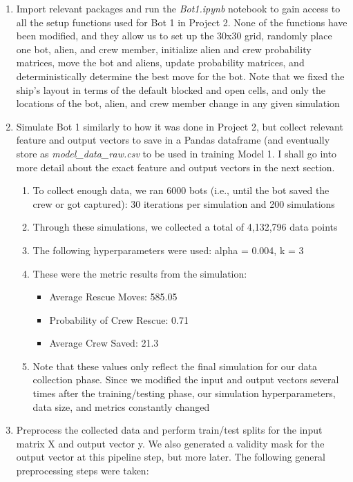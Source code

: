 \documentclass[11pt]{article}
\begin{document}
\begin{enumerate}
    \item Import relevant packages and run the \emph{Bot1.ipynb} notebook to gain access to all the setup functions used for Bot 1 in Project 2. None of the functions have been modified, and they allow us to set up the 30x30 grid, randomly place one bot, alien, and crew member, initialize alien and crew probability matrices, move the bot and aliens, update probability matrices, and deterministically determine the best move for the bot. Note that we fixed the ship's layout in terms of the default blocked and open cells, and only the locations of the bot, alien, and crew member change in any given simulation
    \item Simulate Bot 1 similarly to how it was done in Project 2, but collect relevant feature and output vectors to save in a Pandas dataframe (and eventually store as \emph{model\_data\_raw.csv} to be used in training Model 1. I shall go into more detail about the exact feature and output vectors in the next section.
    \begin{enumerate}
        \item To collect enough data, we ran 6000 bots (i.e., until the bot saved the crew or got captured): 30 iterations per simulation and 200 simulations
        \item Through these simulations, we collected a total of 4,132,796 data points
        \item The following hyperparameters were used: alpha = 0.004, k = 3
        \item These were the metric results from the simulation:
        \begin{itemize}
            \item Average Rescue Moves: 585.05
            \item Probability of Crew Rescue: 0.71
            \item Average Crew Saved: 21.3
        \end{itemize}
        \item Note that these values only reflect the final simulation for our data collection phase. Since we modified the input and output vectors several times after the training/testing phase, our simulation hyperparameters, data size, and metrics constantly changed
    \end{enumerate}
    \item Preprocess the collected data and perform train/test splits for the input matrix X and output vector y. We also generated a validity mask for the output vector at this pipeline step, but more later. The following general preprocessing steps were taken:

\end{enumerate}
\end{document}
